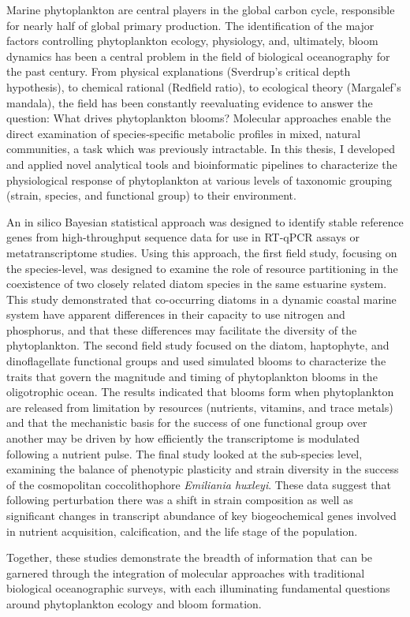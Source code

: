 % 
% 
%
 Marine phytoplankton are central players in the global carbon cycle, responsible for nearly half of global primary production. The identification of the major factors controlling phytoplankton ecology, physiology, and, ultimately, bloom dynamics has been a central problem in the field of biological oceanography for the past century. From physical explanations (Sverdrup's critical depth hypothesis), to chemical rational (Redfield ratio), to ecological theory (Margalef's mandala), the field has been constantly reevaluating evidence to answer the question: What drives phytoplankton blooms? Molecular approaches enable the direct examination of species-specific metabolic profiles in mixed, natural communities, a task which was previously intractable. In this thesis, I developed and applied novel analytical tools and bioinformatic pipelines to characterize the physiological response of phytoplankton at various levels of taxonomic grouping (strain, species, and functional group) to their environment.   \par
An in silico Bayesian statistical approach was designed to identify stable reference genes from high-throughput sequence data for use in RT-qPCR assays or metatranscriptome studies. Using this approach, the first field study, focusing on the species-level, was designed to examine the role of resource partitioning in the coexistence of two closely related diatom species in the same estuarine system. This study demonstrated that co-occurring diatoms in a dynamic coastal marine system have apparent differences in their capacity to use nitrogen and phosphorus, and that these differences may facilitate the diversity of the phytoplankton. The second field study focused on the diatom, haptophyte, and dinoflagellate functional groups and used simulated blooms to characterize the traits that govern the magnitude and timing of phytoplankton blooms in the oligotrophic ocean. The results indicated that blooms form when phytoplankton are released from limitation by resources (nutrients, vitamins, and trace metals) and that the mechanistic basis for the success of one functional group over another may be driven by how efficiently the transcriptome is modulated following a nutrient pulse. The final study looked at the sub-species level, examining the balance of phenotypic plasticity and strain diversity in the success of the cosmopolitan coccolithophore \textit{Emiliania huxleyi}. These data suggest that following perturbation there was a shift in strain composition as well as significant changes in transcript abundance of key biogeochemical genes involved in nutrient acquisition, calcification, and the life stage of the population.\par
Together, these studies demonstrate the breadth of information that can be garnered through the integration of molecular approaches with traditional biological oceanographic surveys, with each illuminating fundamental questions around phytoplankton ecology and bloom formation.



